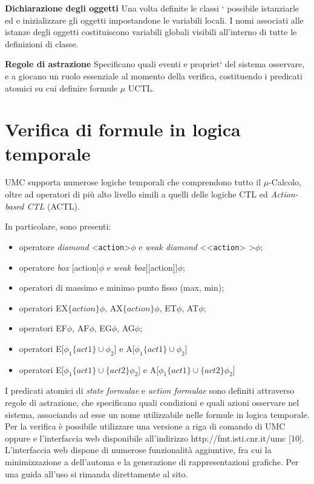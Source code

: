 \textbf{Dichiarazione degli oggetti} Una volta definite le classi ` possibile istanziarle ed
e inizializzare gli oggetti impostandone le variabili locali. I nomi associati
alle istanze degli oggetti costituiscono variabili globali visibili all’interno di tutte le
definizioni di classe.

\textbf{Regole di astrazione} Specificano quali eventi e propriet` del sistema osservare, e
a
giocano un ruolo essenziale al momento della verifica, costituendo i predicati
atomici su cui definire formule $\mu$ UCTL.

\section{Verifica di formule in logica temporale}
UMC supporta numerose logiche temporali che comprendono tutto il $\mu$-Calcolo,
oltre ad operatori di più alto livello simili a quelli delle logiche CTL ed
\textit{Action-based CTL} (ACTL).

In particolare, sono presenti:
\begin{itemize}
  \item operatore \textit{diamond} \textless  \texttt{action}\textgreater$\phi$
  e \textit{weak diamond} \textless\textless  \texttt{action}\textgreater
  \textgreater$\phi$;
  \item operatore \textit{box} [action]$\phi$ e \textit{weak
  box}[[action]]$\phi$;
  \item operatori di massimo e minimo punto fisso (max, min);
  \item operatori EX$\{action\}\phi$, AX$\{action\}\phi$, ET$\phi$, AT$\phi$;
  \item operatori EF$\phi$, AF$\phi$, EG$\phi$, AG$\phi$;
  \item operatori E[$\phi_{1}\{act1\}\cup\phi_{2}$] e
  A[$\phi_{1}\{act1\}\cup\phi_{2}$]
  \item operatori E[$\phi_{1}\{act1\}\cup\{act2\}\phi_{2}$] e
  A[$\phi_{1}\{act1\}\cup\{act2\}\phi_{2}$]
\end{itemize}

I predicati atomici di \textit{state formulae} e \textit{action formulae} sono
definiti attraverso regole di astrazione, che specificano quali condizioni e
quali azioni osservare nel sistema, associando ad esse un nome utilizzabile
nelle formule in logica temporale.
Per la verifica è possibile utilizzare una versione a riga di comando di UMC
oppure e
l’interfaccia web disponibile all’indirizzo http://fmt.isti.cnr.it/umc [10].
L’interfaccia web dispone di numerose funzionalità aggiuntive, fra cui la
minimizzazione a dell’automa e la generazione di rappresentazioni grafiche.
Per una guida all’uso si rimanda direttamente al sito.




